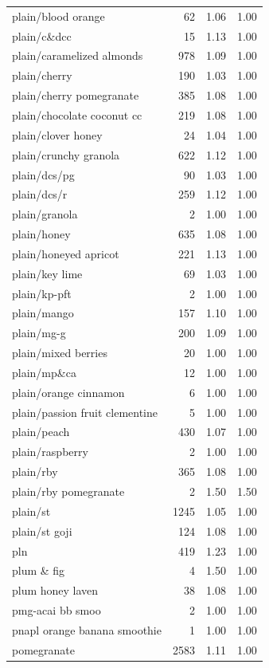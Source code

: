 \begin{table}
\begin{tabular}{lrrr}
plain/blood orange & 62 & 1.06 & 1.00 \\
plain/c\&dcc & 15 & 1.13 & 1.00 \\
plain/caramelized almonds & 978 & 1.09 & 1.00 \\
plain/cherry & 190 & 1.03 & 1.00 \\
plain/cherry pomegranate & 385 & 1.08 & 1.00 \\
plain/chocolate coconut cc & 219 & 1.08 & 1.00 \\
plain/clover honey & 24 & 1.04 & 1.00 \\
plain/crunchy granola & 622 & 1.12 & 1.00 \\
plain/dcs/pg & 90 & 1.03 & 1.00 \\
plain/dcs/r & 259 & 1.12 & 1.00 \\
plain/granola & 2 & 1.00 & 1.00 \\
plain/honey & 635 & 1.08 & 1.00 \\
plain/honeyed apricot & 221 & 1.13 & 1.00 \\
plain/key lime & 69 & 1.03 & 1.00 \\
plain/kp-pft & 2 & 1.00 & 1.00 \\
plain/mango & 157 & 1.10 & 1.00 \\
plain/mg-g & 200 & 1.09 & 1.00 \\
plain/mixed berries & 20 & 1.00 & 1.00 \\
plain/mp\&ca & 12 & 1.00 & 1.00 \\
plain/orange cinnamon & 6 & 1.00 & 1.00 \\
plain/passion fruit clementine & 5 & 1.00 & 1.00 \\
plain/peach & 430 & 1.07 & 1.00 \\
plain/raspberry & 2 & 1.00 & 1.00 \\
plain/rby & 365 & 1.08 & 1.00 \\
plain/rby pomegranate & 2 & 1.50 & 1.50 \\
plain/st & 1245 & 1.05 & 1.00 \\
plain/st goji & 124 & 1.08 & 1.00 \\
pln & 419 & 1.23 & 1.00 \\
plum \& fig & 4 & 1.50 & 1.00 \\
plum honey laven & 38 & 1.08 & 1.00 \\
pmg-acai bb smoo & 2 & 1.00 & 1.00 \\
pnapl orange banana smoothie & 1 & 1.00 & 1.00 \\
pomegranate & 2583 & 1.11 & 1.00 \\

\end{tabular}
\end{table}
